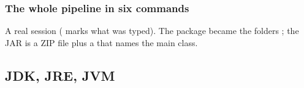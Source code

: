 \documentclass[aspectratio=169,10pt,compress]{beamer}
\begin{document}
\begin{frame}[t,fragile] \frametitle{The whole pipeline in six commands}

  \vspace{0.1em}
  \small
  A real session (\hCode{\$} marks what was typed). 
  The package  became the folders
  ; 
  the JAR is a ZIP file plus a  that names the main class.
\end{frame}

\subsection[JDK]{JDK, JRE, JVM}
\end{document}
